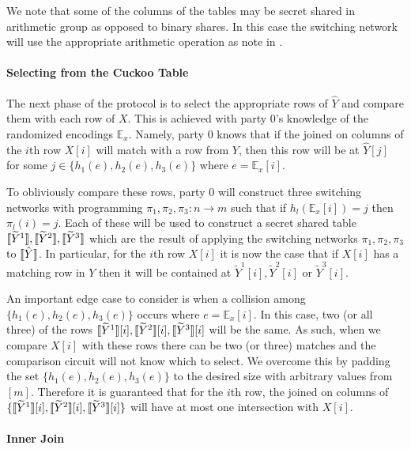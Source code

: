 We note that some of the columns of the tables may be secret shared in arithmetic group as opposed to binary shares. In this case the switching network will use the appropriate arithmetic operation as note in . 

\paragraph{Selecting from the Cuckoo Table}

The next phase of the protocol is to select the appropriate rows of $\hat Y$ and compare them with each row of $X$. This is achieved with party 0's knowledge of the randomized encodings $\mathbb{E}_x$. Namely, party 0 knows that if the joined on columns of the $i$th row $X[i]$ will match with a row from $Y$, then this row will be at $\hat Y[j]$ for some $j\in \{h_1(e),h_2(e), h_3(e)\}$ where  $e=\mathbb{E}_x[i]$. 

To obliviously compare these rows, party 0 will construct three switching networks with programming $\pi_1,\pi_2,\pi_3 : n\rightarrow m$ such that if $h_l(\mathbb{E}_x[i])=j$ then $\pi_l(i)=j$. Each of these will be used to construct a secret shared table $\llbracket \widetilde{Y}^1\rrbracket,\llbracket \widetilde{Y}^2\rrbracket,\llbracket \widetilde{Y}^3\rrbracket$ which are the result of applying the switching networks $\pi_1,\pi_2,\pi_3$ to $\llbracket \hat Y\rrbracket$. In particular, for the $i$th row $X[i]$ it is now the case that if $X[i]$ has a matching row in $Y$ then it will be contained at  $\widetilde{Y}^1[i],\widetilde{Y}^2[i]$ or ${\widetilde{Y}^3}[i]$. 

An important edge case to consider is when a collision among $\{h_1(e),h_2(e), h_3(e)\}$ occurs where $e= \mathbb{E}_x[i]$. In this case, two (or all three) of the rows $\llbracket \widetilde{Y}^1\rrbracket[i],\llbracket \widetilde{Y}^2\rrbracket[i],\llbracket \widetilde{Y}^3\rrbracket[i]$ will be the same. As such, when we compare $X[i]$ with these rows there can be two (or three) matches and the comparison circuit will not know which to select. We overcome this by padding the set $\{h_1(e),h_2(e), h_3(e)\}$ to the desired size with arbitrary values from $[m]$. Therefore it is guaranteed that for the $i$th row, the joined on columns of $\{\llbracket \widetilde{Y}^1\rrbracket[i],\llbracket \widetilde{Y}^2\rrbracket[i],\llbracket \widetilde{Y}^3\rrbracket[i]\}$ will  have at most one intersection with $X[i]$.


\paragraph{Inner Join}

